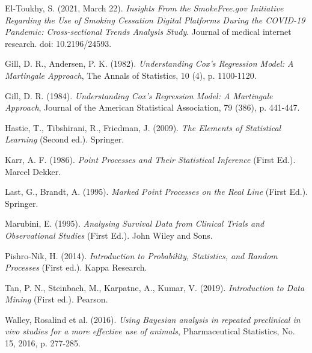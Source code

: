 \documentclass[
  11pt,
]{article}
\begin{document}
\begin{thebibliography}{1}
 El-Toukhy, S. (2021, March 22). \textit{Insights From the SmokeFree.gov Initiative Regarding the Use of Smoking Cessation Digital Platforms During the COVID-19 Pandemic: Cross-sectional Trends Analysis Study}. Journal of medical internet research. doi: 10.2196/24593.

 Gill, D. R., Andersen, P. K. (1982). \textit{Understanding Cox's Regression Model: A Martingale Approach}, The Annals of Statistics, 10 (4), p. 1100-1120.

 Gill, D. R. (1984). \textit{Understanding Cox's Regression Model: A Martingale Approach}, Journal of the American Statistical Association, 79 (386), p. 441-447.

 Hastie, T., Tibshirani, R., Friedman, J. (2009). \textit{The Elements of Statistical Learning} (Second ed.). Springer. 

 Karr, A. F. (1986). \textit{Point Processes and Their Statistical Inference} (First Ed.). Marcel Dekker.

 Last, G., Brandt, A. (1995). \textit{Marked Point Processes on the Real Line} (First Ed.). Springer.

 Marubini, E. (1995). \textit{Analysing Survival Data from Clinical Trials and Observational Studies} (First Ed.). John Wiley and Sons.

 Pishro-Nik, H. (2014). \textit{Introduction to Probability, Statistics, and Random Processes} (First ed.). Kappa Research. 

 Tan, P. N., Steinbach, M., Karpatne, A., Kumar, V. (2019). \textit{Introduction to Data Mining} (First ed.). Pearson.

 Walley, Rosalind et al. (2016). \textit{Using Bayesian analysis in repeated preclinical in vivo studies for a more effective use of animals}, Pharmaceutical Statistics, No. 15, 2016, p. 277-285.

\end{thebibliography}
\end{document}
